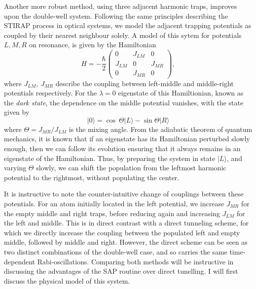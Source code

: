 Another more robust method, using three adjacent harmonic traps, improves upon the double-well system. Following the same principles describing the STIRAP process in optical systems, we model the adjacent trapping potentials as coupled by their nearest neighbour solely. A model of this sytem for potentials $L,M,R$ on resonance, is given by the Hamiltonian
\begin{equation}\label{eqn:sap_ham}
    H = -\frac{\hbar}{2}
    \begin{pmatrix}
        0 & J_{LM} & 0 \\
        J_{LM} & 0 & J_{MR} \\
        0 & J_{MR} & 0
    \end{pmatrix},
\end{equation}
where $J_{LM},~J_{MR}$ describe the coupling between left-middle and middle-right potentials respectively. For the $\lambda=0$ eigenstate of this Hamiltionian, known as the \textit{dark state}, the dependence on the middle potential vanishes, with the state given by
\begin{equation}
 | 0 \rangle = \cos\ \Theta| L \rangle - \sin \Theta | R \rangle
\end{equation}
where $\Theta=J_{MR}/J_{LM}$ is the mixing angle. From the adiabatic theorem of quantum mechanics, it is known that if an eigenstate has its Hamiltonian perturbed slowly enough, then we can follow its evolution ensuring that it always remains in an eigenstate of the Hamiltonian. Thus, by preparing the system in state $| L \rangle$, and varying $\Theta$ slowly, we can shift the population from the leftmost harmonic potential to the rightmost, without populating the center.

It is instructive to note the counter-intuitive change of couplings between these potentials. For an atom initially located in the left potential, we increase $J_{MR}$ for the empty middle and right traps, before reducing again and increasing $J_{LM}$ for the left and middle. This is in direct contrast with a direct tunneling scheme, for which we directly increase the coupling between the populated left and empty middle, followed by middle and right. However, the direct scheme can be seen as two distinct combinations of the double-well case, and so carries the same time-dependent Rabi-oscillations. Comparing both methods will be instructive in discussing the advantages of the SAP routine over direct tunelling. I will first discuss the physical model of this system.

